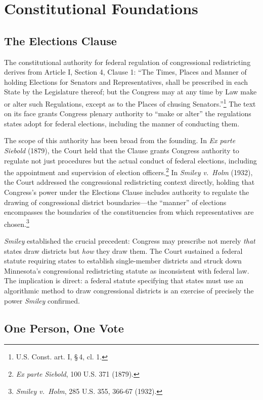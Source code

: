 \section{Constitutional Foundations}
\label{sec:constitutional}

\subsection{The Elections Clause}

The constitutional authority for federal regulation of congressional redistricting derives from Article I, Section 4, Clause 1: ``The Times, Places and Manner of holding Elections for Senators and Representatives, shall be prescribed in each State by the Legislature thereof; but the Congress may at any time by Law make or alter such Regulations, except as to the Places of chusing Senators.''\footnote{U.S. Const. art. I, \S\,4, cl. 1.} The text on its face grants Congress plenary authority to ``make or alter'' the regulations states adopt for federal elections, including the manner of conducting them.

The scope of this authority has been broad from the founding. In \textit{Ex parte Siebold} (1879), the Court held that the Clause grants Congress authority to regulate not just procedures but the actual conduct of federal elections, including the appointment and supervision of election officers.\footnote{\textit{Ex parte Siebold}, 100 U.S. 371 (1879).} In \textit{Smiley v.\ Holm} (1932), the Court addressed the congressional redistricting context directly, holding that Congress's power under the Elections Clause includes authority to regulate the drawing of congressional district boundaries---the ``manner'' of elections encompasses the boundaries of the constituencies from which representatives are chosen.\footnote{\textit{Smiley v.\ Holm}, 285 U.S. 355, 366-67 (1932).}

\textit{Smiley} established the crucial precedent: Congress may prescribe not merely \textit{that} states draw districts but \textit{how} they draw them. The Court sustained a federal statute requiring states to establish single-member districts and struck down Minnesota's congressional redistricting statute as inconsistent with federal law. The implication is direct: a federal statute specifying that states must use an algorithmic method to draw congressional districts is an exercise of precisely the power \textit{Smiley} confirmed.

\subsection{One Person, One Vote}

